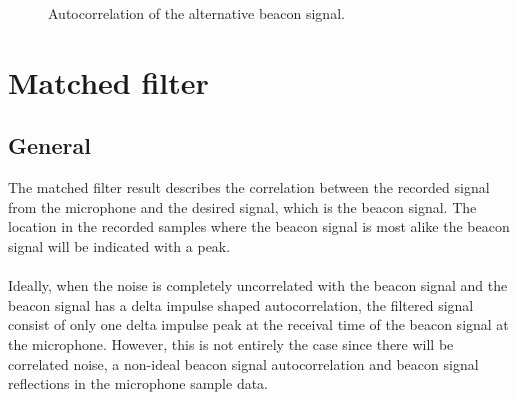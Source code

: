 \documentclass[final]{scrreprt} %
\begin{document}
\begin{figure}[H]
	\centering
	\setlength\figureheight{4cm}
    	\setlength{}
	
	\caption{Autocorrelation of the alternative beacon signal.}
	\label{fig:own-correlation}
\end{figure}

\section{Matched filter}
\iffalse
A matched filter is used to filter the received audio data from the microphones to the desired signal.
The desired signal will be the beacon signal and the noise that is also present in the received audio data must ideally be removed.
In order to get the noise filtered out, a convolution is used.
This works under the assumption that the desired signal's autocorrelation function is shaped like a delta impulse as described in the previous section.
Since the beacon signal is designed to fit this criterion as much as possible, a reasonable matched filter should be able to be designed.
\\ \\
\fi

\subsection{General}
The matched filter result describes the correlation between the recorded signal from the microphone and the desired signal, which is the beacon signal.
The location in the recorded samples where the beacon signal is most alike the beacon signal will be indicated with a peak.
\\ \\
Ideally, when the noise is completely uncorrelated with the beacon signal and the beacon signal has a delta impulse shaped autocorrelation, the filtered signal consist of only one delta impulse peak at the receival time of the beacon signal at the microphone.
However, this is not entirely the case since there will be correlated noise, a non-ideal beacon signal autocorrelation and beacon signal reflections in the microphone sample data.
\end{document}

